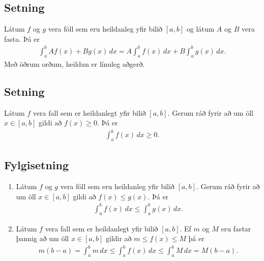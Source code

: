 \documentclass[b5paper,11pt,icelandic]{sphinxmanual}
\begin{document}
\subsection{Setning}
\label{kafli06:id4}
Látum \(f\) og \(g\) vera föll sem eru heildanleg yfir bilið
\([a,b]\) og látum \(A\) og \(B\) vera fasta. Þá er
\begin{equation*}
\begin{split}\int_a^b Af(x)+Bg(x)\,dx=A\int_a^b f(x)\,dx+B\int_a^b g(x)\,dx.\end{split}
\end{equation*}
Með öðrum orðum, heildun er línuleg aðgerð.


\subsection{Setning}
\label{kafli06:id5}
Látum \(f\) vera fall sem er heildanlegt yfir bilið \([a, b]\).
Gerum ráð fyrir að um öll \(x\in [a, b]\) gildi að
\(f(x)\geq 0\). Þá er
\begin{equation*}
\begin{split}\int_a^b f(x)\,dx\geq 0.\end{split}
\end{equation*}

\subsection{Fylgisetning}
\label{kafli06:fylgisetning}\begin{enumerate}
\item {} 
Látum \(f\) og \(g\) vera föll sem eru heildanleg yfir
bilið \([a, b]\). Gerum ráð fyrir að um öll \(x\in [a, b]\)
gildi að \(f(x)\leq g(x)\). Þá er
\begin{equation*}
\begin{split}\int_a^b f(x)\,dx\leq \int_a^b g(x)\,dx.\end{split}
\end{equation*}
\item {} 
Látum \(f\) vera fall sem er heildanlegt yfir bilið
\([a, b]\). Ef \(m\) og \(M\) eru fastar þannig að um
öll \(x\in [a, b]\) gildir að \(m\leq f(x)\leq M\) þá er
\begin{equation*}
\begin{split}m(b-a)= \int_a^b m\,dx \leq  \int_a^b f(x)\,dx \leq \int_a^b M\,dx =M(b-a).\end{split}
\end{equation*}
\end{enumerate}
\end{document}
